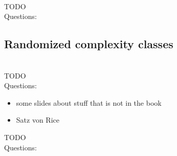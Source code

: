 \documentclass[a4]{scrartcl}
\begin{document}
\ \\

\color{red} TODO \\
\color{black}
\color{violet} Questions: \\
\color{black}

























\subsection*{Randomized complexity classes}



\ \\

\color{red} TODO \\
\color{black}
\color{violet} Questions: \\
\color{black}




\begin{itemize}
\item some slides about stuff that is not in the book
\item Satz von Rice
\end{itemize}


\color{red} TODO \\
\color{black}
\color{violet} Questions: \\
\color{black}



\newpage

\printbibliography
\end{document}
